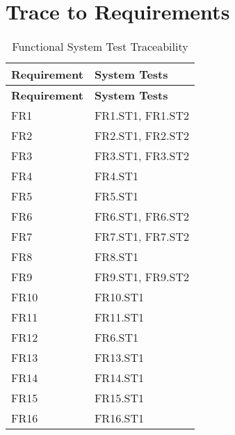 \documentclass[12pt, titlepage]{article}
\begin{document}
\section{Trace to Requirements}

\begin{longtable}[H]{|p{} | p{}|}
  \caption{Functional System Test Traceability}
  \label{TblFRSTTraceability}\\
  \hline
  \textbf{Requirement} & \textbf{System Tests}\\
  \hline
  \endfirsthead
  \hline
  \textbf{Requirement} & \textbf{System Tests}\\
  \hline
  \endhead
  FR1 & FR1.ST1, FR1.ST2\\
  \hline
  FR2 & FR2.ST1, FR2.ST2\\
  \hline
  FR3 & FR3.ST1, FR3.ST2\\
  \hline
  FR4 & FR4.ST1\\
  \hline
  FR5 & FR5.ST1\\
  \hline
  FR6 & FR6.ST1, FR6.ST2\\
  \hline
  FR7 & FR7.ST1, FR7.ST2\\
  \hline
  FR8 & FR8.ST1\\
  \hline
  FR9 & FR9.ST1, FR9.ST2\\
  \hline
  FR10 & FR10.ST1\\
  \hline
  FR11 & FR11.ST1\\
  \hline
  FR12 & FR6.ST1\\
  \hline
  FR13 & FR13.ST1\\
  \hline
  FR14 & FR14.ST1\\
  \hline
  FR15 & FR15.ST1\\
  \hline
  FR16 & FR16.ST1\\
  \hline
\end{longtable}
\end{document}
